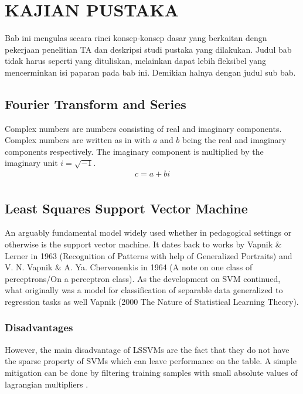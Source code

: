 \chapter{KAJIAN PUSTAKA}

\noindent Bab ini mengulas secara rinci konsep-konsep dasar yang berkaitan dengn pekerjaan penelitian TA dan deskripsi studi pustaka yang dilakukan. Judul bab tidak harus seperti yang dituliskan, melainkan dapat lebih fleksibel yang mencerminkan isi paparan pada bab ini. Demikian halnya dengan judul sub bab.

\section{Fourier Transform and Series}
\noindent

Complex numbers are numbers consisting of real and imaginary components. Complex numbers are written as in  with \(a \) and \(b \) being the real and imaginary components respectively. The imaginary component is multiplied by the imaginary unit \(i=\sqrt{-1}\).
\begin{align}
  c = a + bi \label{eq:complex_number} \\
\end{align}

\section{Least Squares Support Vector Machine}
\noindent An arguably fundamental model widely used whether in pedagogical settings or otherwise is the support vector machine. It dates back to works by Vapnik \& Lerner in 1963 (Recognition of Patterns with help of Generalized Portraits) and V. N. Vapnik \& A. Ya. Chervonenkis in 1964 (A note on one class of perceptrons/On a perceptron class). As the development on SVM continued, what originally was a model for classification of separable data generalized to regression tasks as well Vapnik (2000 The Nature of Statistical Learning Theory).
\subsection{Disadvantages}
However, the main disadvantage of LSSVMs are the fact that they do not have the sparse property of SVMs which can leave performance on the table. A simple mitigation can be done by filtering training samples with small absolute values of lagrangian multipliers \autocite{haifengwangComparisonSVMLSSVM2005}.

